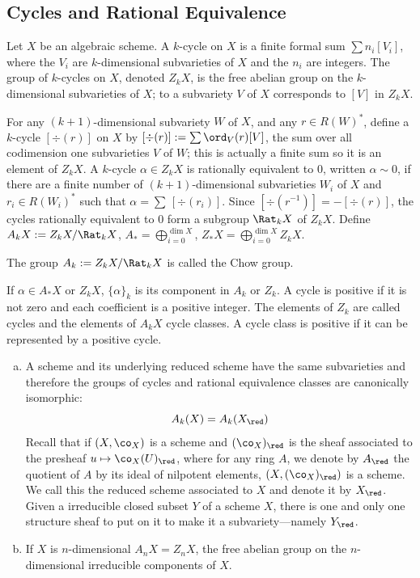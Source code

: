\subsection{Cycles and Rational Equivalence}


Let $X$ be an algebraic scheme. A $k$-cycle on $X$ is a finite formal sum $\sum n_i [V_i]$, where the $V_i$ are $k$-dimensional subvarieties of $X$ and the $n_i$ are integers. The group of $k$-cycles on $X$, denoted $Z_kX$, is the free abelian group on the $k$-dimensional subvarieties of $X$; to a subvariety $V$ of $X$ corresponds to $[V]$ in $Z_kX$.


For any $(k+1)$-dimensional subvariety $W$ of $X$, and any $r \in R(W)^*$, define a $k$-cycle $[\div(r)]$ on $X$ by $[\div(r)]:=\sum \ord_V(r)[V]$, the sum over all codimension one subvarieties $V$ of $W$; this is actually a finite sum so it is an element of $Z_kX$. A $k$-cycle $\alpha \in Z_kX$ is rationally equivalent to 0, written $\alpha \sim 0$, if there are a finite number of $(k+1)$-dimensional subvarieties $W_i$ of $X$ and $r_i \in R(W_i)^*$ such that $\alpha=\sum \,[\div(r_i)]$. Since $[\div(r^{-1})]= -[\div(r)]$, the cycles rationally equivalent to 0 form a subgroup $\Rat_k X$ of $Z_kX$. Define $A_k X:= Z_kX/\Rat_kX$, $A_*= \bigoplus_{i=0}^{\dim X}$, $Z_*X= \bigoplus_{i=0}^{\dim X} Z_kX$.


\begin{dfn}
The group $A_k:= Z_kX/\Rat_k X$ is called the Chow group. 
\end{dfn}


If $\alpha \in A_*X$ or $Z_kX$, $\{\alpha\}_k$ is its component in $A_k$ or $Z_k$. A cycle is positive if it is not zero and each coefficient is a positive integer. The elements of $Z_k$ are called cycles and the elements of $A_kX$ cycle classes. A cycle class is positive if it can be represented by a positive cycle. 


\begin{ex}\label{ex:1.3.2} \hfill
\begin{enumerate}[(a)]
\item A scheme and its underlying reduced scheme have the same subvarieties and therefore the groups of cycles and rational equivalence classes are canonically isomorphic:
	\[
	A_k(X)= A_k(X_\red)
	\]
Recall that if $(X,\co_X)$ is a scheme and $(\co_X)_\red$ is the sheaf associated to the presheaf $u \mapsto \co_X(U)_\red$, where for any ring $A$, we denote by $A_\red$ the quotient of $A$ by its ideal of nilpotent elements, $(X,(\co_X)_\red)$ is a scheme. We call this the reduced scheme associated to $X$ and denote it by $X_\red$. Given a irreducible closed subset $Y$ of a scheme $X$, there is one and only one structure sheaf to put on it to make it a subvariety---namely $Y_\red$.

\item If $X$ is $n$-dimensional $A_nX=Z_nX$, the free abelian group on the $n$-dimensional irreducible components of $X$. 
\end{enumerate}
\end{ex}

